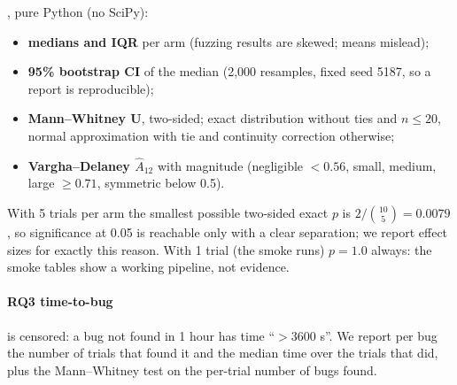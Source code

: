 , pure Python (no SciPy):
\begin{itemize}
  \item \textbf{medians and IQR} per arm (fuzzing results are skewed; means
    mislead);
  \item \textbf{95\% bootstrap CI} of the median (2{,}000 resamples, fixed seed
    5187, so a report is reproducible);
  \item \textbf{Mann--Whitney U}, two-sided; exact distribution without ties
    and $n\leq 20$, normal approximation with tie and continuity
    correction otherwise;
  \item \textbf{Vargha--Delaney $\hat A_{12}$} with magnitude (negligible
    $<0.56$, small, medium, large $\geq 0.71$, symmetric below 0.5).
\end{itemize}
With 5 trials per arm the smallest possible two-sided exact $p$ is
$2/\binom{10}{5} = 0.0079$, so significance at 0.05 is reachable only with a
clear separation; we report effect sizes for exactly this reason. With 1 trial
(the smoke runs) $p = 1.0$ always: the smoke tables show a working pipeline,
not evidence.

\paragraph{RQ3 time-to-bug} is censored: a bug not found in 1 hour has time
``$>$3600 s''. We report per bug the number of trials that found it and the
median time over the trials that did, plus the Mann--Whitney test on the
per-trial number of bugs found.
